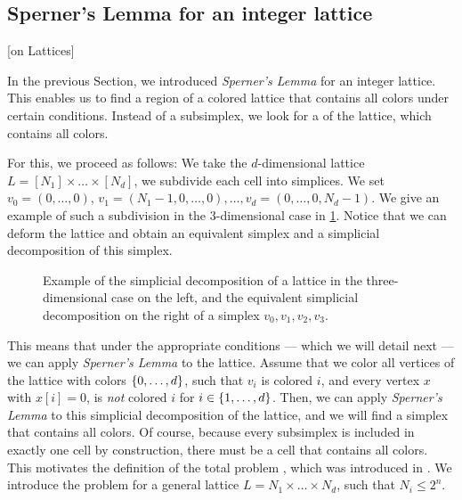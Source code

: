 \subsection{Sperner's Lemma for an integer lattice}[on Lattices]

In the previous Section, we introduced \textit{Sperner's Lemma} for an integer lattice. This enables us to find a region of a colored lattice that contains all colors under certain conditions. Instead of a subsimplex, we look for a  of the lattice, which contains all colors.

For this, we proceed as follows: We take the $d$-dimensional lattice $L = [N_1] \times \dots \times [N_d]$, we subdivide each cell into simplices. We set $v_0 = (0, \dots, 0)$, $v_1 = (N_1 - 1, 0, \dots, 0), \dots, v_d = (0, \dots, 0, N_d - 1)$. We give an example of such a subdivision in the 3-dimensional case in \cref{fig:sperner_lattice_example}. Notice that we can deform the lattice and obtain an equivalent simplex and a simplicial decomposition of this simplex.

\begin{figure}
	\centering
	\caption[Example of a simplicial decomposition of a lattice]{Example of the simplicial decomposition of a lattice in the three-dimensional case on the left, and the equivalent simplicial decomposition on the right of a simplex $v_0, v_1, v_2, v_3$.}
	\label{fig:sperner_lattice_example}
\end{figure}

This means that under the appropriate conditions --- which we will detail next --- we can apply \textit{Sperner's Lemma} to the lattice. Assume that we color all vertices of the lattice with colors $\left\{0, \dots, d\right\}$, such that $v_i$ is colored $i$, and every vertex $x$ with $x[i] = 0$, is \textit{not} colored $i$ for $i \in \left\{1, \dots, d\right\}$. Then, we can apply \textit{Sperner's Lemma} to this simplicial decomposition of the lattice, and we will find a simplex that contains all colors. Of course, because every subsimplex is included in exactly one cell by construction, there must be a cell that contains all colors. This motivates the definition of the total problem \Sperner, which was introduced in . We introduce the problem for a general lattice $L = N_1 \times \dots \times N_d$, such that $N_i \leq 2^n$.

